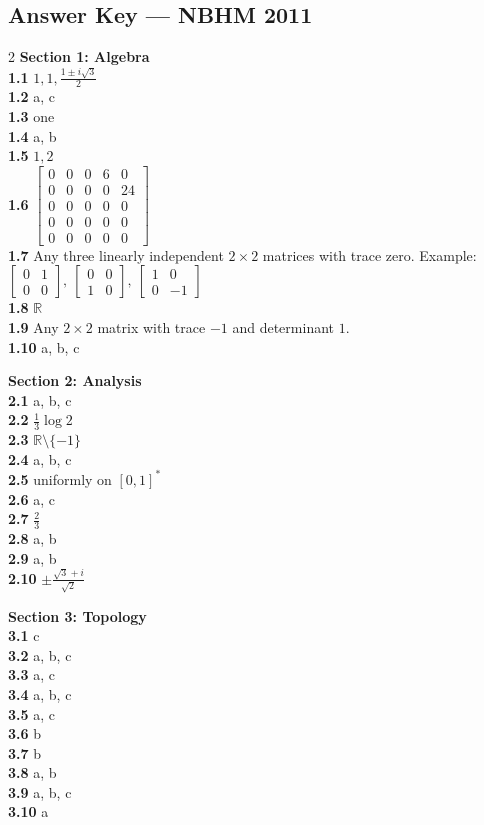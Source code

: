 \documentclass[11pt,a4paper]{article}
\newcommand{\R}{\mathbb{R}}
\newcommand{\examsec}[1]{%
  \subsection*{#1}
  \vspace{-2pt}
}
\begin{document}
\examsec{Answer Key --- NBHM 2011}
\begin{multicols}{2}
\textbf{Section 1: Algebra}\\
\textbf{1.1} $1, 1, \frac{1 \pm i\sqrt{3}}{2}$\\
\textbf{1.2} a, c\\
\textbf{1.3} one\\
\textbf{1.4} a, b\\
\textbf{1.5} $1, 2$\\
\textbf{1.6} $\begin{bmatrix} 0 & 0 & 0 & 6 & 0 \\ 0 & 0 & 0 & 0 & 24 \\ 0 & 0 & 0 & 0 & 0 \\ 0 & 0 & 0 & 0 & 0 \\ 0 & 0 & 0 & 0 & 0 \end{bmatrix}$\\
\textbf{1.7} Any three linearly independent $2 \times 2$ matrices with trace zero. Example: $\begin{bmatrix} 0 & 1 \\ 0 & 0 \end{bmatrix},\ \begin{bmatrix} 0 & 0 \\ 1 & 0 \end{bmatrix},\ \begin{bmatrix} 1 & 0 \\ 0 & -1 \end{bmatrix}$\\
\textbf{1.8} $\R$\\
\textbf{1.9} Any $2 \times 2$ matrix with trace $-1$ and determinant $1$.\\
\textbf{1.10} a, b, c

\medskip
\textbf{Section 2: Analysis}\\
\textbf{2.1} a, b, c\\
\textbf{2.2} $\frac{1}{3}\log 2$\\
\textbf{2.3} $\R \setminus \{-1\}$\\
\textbf{2.4} a, b, c\\
\textbf{2.5} uniformly on $[0, 1]^*$\\
\textbf{2.6} a, c\\
\textbf{2.7} $\frac{2}{3}$\\
\textbf{2.8} a, b\\
\textbf{2.9} a, b\\
\textbf{2.10} $\pm\frac{\sqrt{3}+i}{\sqrt{2}}$

\medskip
\textbf{Section 3: Topology}\\
\textbf{3.1} c\\
\textbf{3.2} a, b, c\\
\textbf{3.3} a, c\\
\textbf{3.4} a, b, c\\
\textbf{3.5} a, c\\
\textbf{3.6} b\\
\textbf{3.7} b\\
\textbf{3.8} a, b\\
\textbf{3.9} a, b, c\\
\textbf{3.10} a


\end{multicols}
\end{document}
